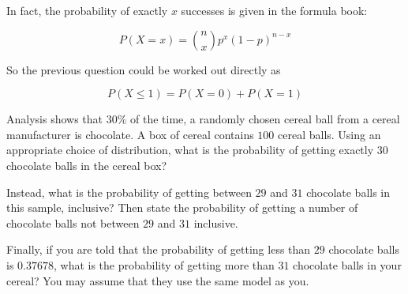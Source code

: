 In fact, the probability of exactly $x$ successes is given in the formula book:

\[ P(X=x) = \binom{n}{x}p^x(1-p)^{n-x}\]

So the previous question could be worked out directly as 

\[ P(X\leq1) = P(X=0) + P(X=1)\]

\begin{exercise}
    Analysis shows that $30\%$ of the time, a randomly chosen cereal ball from a cereal manufacturer is chocolate. A box of cereal contains $100$ cereal balls. Using an appropriate choice of distribution, what is the probability of getting exactly $30$ chocolate balls in the cereal box?

    Instead, what is the probability of getting between $29$ and $31$ chocolate balls in this sample, inclusive? Then state the probability of getting a number of chocolate balls not between $29$ and $31$ inclusive.

    Finally, if you are told that the probability of getting less than $29$ chocolate balls is $0.37678$, what is the probability of getting more than $31$ chocolate balls in your cereal? You may assume that they use the same model as you.
\end{exercise}
